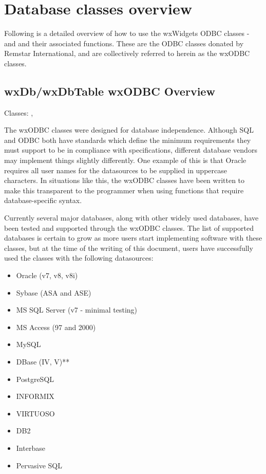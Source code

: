 \section{Database classes overview}\label{odbcoverview}

Following is a detailed overview of how to use the wxWidgets ODBC classes -  
and  and their associated functions. These are 
the ODBC classes donated by Remstar International, and are collectively 
referred to herein as the wxODBC classes.

\subsection{wxDb/wxDbTable wxODBC Overview}\label{wxodbcoverview}

Classes: , 

The wxODBC classes were designed for database independence. Although SQL and 
ODBC both have standards which define the minimum requirements they must 
support to be in compliance with specifications, different database vendors 
may implement things slightly differently. One example of this is that Oracle 
requires all user names for the datasources to be supplied in uppercase 
characters. In situations like this, the wxODBC classes have been written 
to make this transparent to the programmer when using functions that require 
database-specific syntax.

Currently several major databases, along with other widely used databases, 
have been tested and supported through the wxODBC classes. The list of 
supported databases is certain to grow as more users start implementing 
software with these classes, but at the time of the writing of this document, 
users have successfully used the classes with the following datasources:

\begin{itemize}\itemsep=0pt
\item Oracle (v7, v8, v8i)
\item Sybase (ASA and ASE)
\item MS SQL Server (v7 - minimal testing)
\item MS Access (97 and 2000)
\item MySQL
\item DBase (IV, V)**
\item PostgreSQL
\item INFORMIX
\item VIRTUOSO
\item DB2
\item Interbase
\item Pervasive SQL
\end{itemize}

